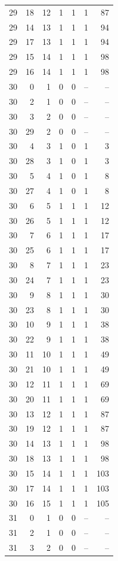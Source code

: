 \begin{longtable}{rrrrrrr}
29 & 18 & 12 & 1 & 1 & 1 & 87\\
29 & 14 & 13 & 1 & 1 & 1 & 94\\
29 & 17 & 13 & 1 & 1 & 1 & 94\\
29 & 15 & 14 & 1 & 1 & 1 & 98\\
29 & 16 & 14 & 1 & 1 & 1 & 98\\
30 & 0 & 1 & 0 & 0 & -- & --\\
30 & 2 & 1 & 0 & 0 & -- & --\\
30 & 3 & 2 & 0 & 0 & -- & --\\
30 & 29 & 2 & 0 & 0 & -- & --\\
30 & 4 & 3 & 1 & 0 & 1 & 3\\
30 & 28 & 3 & 1 & 0 & 1 & 3\\
30 & 5 & 4 & 1 & 0 & 1 & 8\\
30 & 27 & 4 & 1 & 0 & 1 & 8\\
30 & 6 & 5 & 1 & 1 & 1 & 12\\
30 & 26 & 5 & 1 & 1 & 1 & 12\\
30 & 7 & 6 & 1 & 1 & 1 & 17\\
30 & 25 & 6 & 1 & 1 & 1 & 17\\
30 & 8 & 7 & 1 & 1 & 1 & 23\\
30 & 24 & 7 & 1 & 1 & 1 & 23\\
30 & 9 & 8 & 1 & 1 & 1 & 30\\
30 & 23 & 8 & 1 & 1 & 1 & 30\\
30 & 10 & 9 & 1 & 1 & 1 & 38\\
30 & 22 & 9 & 1 & 1 & 1 & 38\\
30 & 11 & 10 & 1 & 1 & 1 & 49\\
30 & 21 & 10 & 1 & 1 & 1 & 49\\
30 & 12 & 11 & 1 & 1 & 1 & 69\\
30 & 20 & 11 & 1 & 1 & 1 & 69\\
30 & 13 & 12 & 1 & 1 & 1 & 87\\
30 & 19 & 12 & 1 & 1 & 1 & 87\\
30 & 14 & 13 & 1 & 1 & 1 & 98\\
30 & 18 & 13 & 1 & 1 & 1 & 98\\
30 & 15 & 14 & 1 & 1 & 1 & 103\\
30 & 17 & 14 & 1 & 1 & 1 & 103\\
30 & 16 & 15 & 1 & 1 & 1 & 105\\
31 & 0 & 1 & 0 & 0 & -- & --\\
31 & 2 & 1 & 0 & 0 & -- & --\\
31 & 3 & 2 & 0 & 0 & -- & --\\

\end{longtable}
